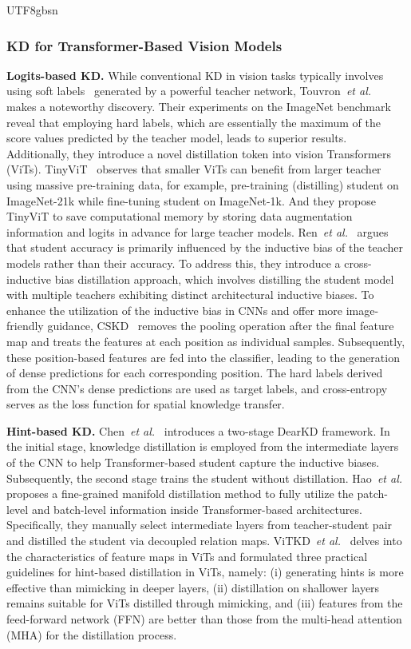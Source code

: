 \documentclass[10pt,journal,compsoc]{IEEEtran}
\newcommand{\etal}{\emph{et al.}}
\newcommand{\<}{\left\langle}
\renewcommand{\>}{\right\rangle}
\newcommand{\1}{\mathbbm{1}}
\begin{document}
\begin{CJK}{UTF8}{gbsn}
\subsubsection{KD for Transformer-Based Vision Models}
\noindent\textbf{Logits-based KD.}
While conventional KD in vision tasks typically involves using soft labels~\cite{hinton2015distilling,yu2022unified,hao2023vanillakd} generated by a powerful teacher network, Touvron~\etal~\cite{touvron2021training} makes a noteworthy discovery. Their experiments on the ImageNet benchmark reveal that employing hard labels, which are essentially the maximum of the score values predicted by the teacher model, leads to superior results. Additionally, they introduce a novel distillation token into vision Transformers (ViTs)\cite{dosovitskiy2020image}.
TinyViT~\cite{wu2022tinyvit} observes that smaller ViTs can benefit from larger teacher using massive pre-training data, for example, pre-training (distilling) student on ImageNet-21k while fine-tuning student on ImageNet-1k. And they propose TinyViT to save computational memory by storing data augmentation information and logits in advance for large teacher models.
Ren~\etal~\cite{ren2022co} argues that student accuracy is primarily influenced by the inductive bias of the teacher models rather than their accuracy. To address this, they introduce a cross-inductive bias distillation approach, which involves distilling the student model with multiple teachers exhibiting distinct architectural inductive biases.
To enhance the utilization of the inductive bias in CNNs and offer more image-friendly guidance, CSKD~\cite{zhao2023cumulative} removes the pooling operation after the final feature map and treats the features at each position as individual samples. Subsequently, these position-based features are fed into the classifier, leading to the generation of dense predictions for each corresponding position. The hard labels derived from the CNN's dense predictions are used as target labels, and cross-entropy serves as the loss function for spatial knowledge transfer.

\noindent\textbf{Hint-based KD.}
Chen~\etal~\cite{chen2022dearkd} introduces a two-stage DearKD framework. In the initial stage, knowledge distillation is employed from the intermediate layers of the CNN to help Transformer-based student capture the inductive biases. Subsequently, the second stage trains the student without distillation.
Hao~\etal~\cite{hao2022learning} proposes a fine-grained manifold distillation method to fully utilize the patch-level and batch-level information inside Transformer-based architectures. Specifically, they manually select intermediate layers from teacher-student pair and distilled the student via decoupled relation maps.
ViTKD~\etal~\cite{yang2022vitkd} delves into the characteristics of feature maps in ViTs and formulated three practical guidelines for hint-based distillation in ViTs, namely: (i) generating hints is more effective than mimicking in deeper layers, (ii) distillation on shallower layers remains suitable for ViTs distilled through mimicking, and (iii) features from the feed-forward network (FFN) are better than those from the multi-head attention (MHA) for the distillation process.


\end{CJK}
\end{document}
